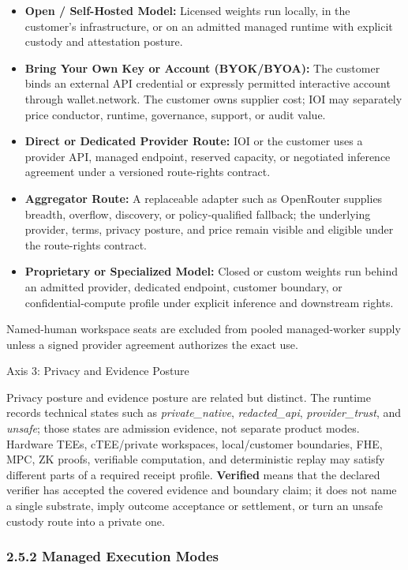 \documentclass[
  11pt,
]{article}
\providecommand{\tightlist}{%
  \setlength{\itemsep}{0pt}\setlength{\parskip}{0pt}}
\begin{document}
\begin{itemize}
\tightlist
\item
  \textbf{Open / Self-Hosted Model:} Licensed weights run locally, in the
  customer's infrastructure, or on an admitted managed runtime with
  explicit custody and attestation posture.
\item
  \textbf{Bring Your Own Key or Account (BYOK/BYOA):} The customer binds
  an external API credential or expressly permitted interactive account
  through wallet.network. The customer owns supplier cost; IOI may
  separately price conductor, runtime, governance, support, or audit
  value.
\item
  \textbf{Direct or Dedicated Provider Route:} IOI or the customer uses
  a provider API, managed endpoint, reserved capacity, or negotiated
  inference agreement under a versioned route-rights contract.
\item
  \textbf{Aggregator Route:} A replaceable adapter such as OpenRouter
  supplies breadth, overflow, discovery, or policy-qualified fallback;
  the underlying provider, terms, privacy posture, and price remain
  visible and eligible under the route-rights contract.
\item
  \textbf{Proprietary or Specialized Model:} Closed or custom weights run
  behind an admitted provider, dedicated endpoint, customer boundary, or
  confidential-compute profile under explicit inference and downstream
  rights.
\end{itemize}

Named-human workspace seats are excluded from pooled managed-worker
supply unless a signed provider agreement authorizes the exact use.

Axis 3: Privacy and Evidence Posture

Privacy posture and evidence posture are related but distinct. The runtime
records technical states such as \emph{private\_native},
\emph{redacted\_api}, \emph{provider\_trust}, and \emph{unsafe}; those
states are admission evidence, not separate product modes. Hardware TEEs,
cTEE/private workspaces, local/customer boundaries, FHE, MPC, ZK proofs,
verifiable computation, and deterministic replay may satisfy different
parts of a required receipt profile. \textbf{Verified} means that the declared
verifier has accepted the covered evidence and boundary claim; it does not
name a single substrate, imply outcome acceptance or settlement, or turn an
unsafe custody route into a private one.

\hypertarget{the-derived-presets-lanes}{%
\subsubsection{2.5.2 Managed Execution Modes}\label{the-derived-presets-lanes}}
\end{document}
